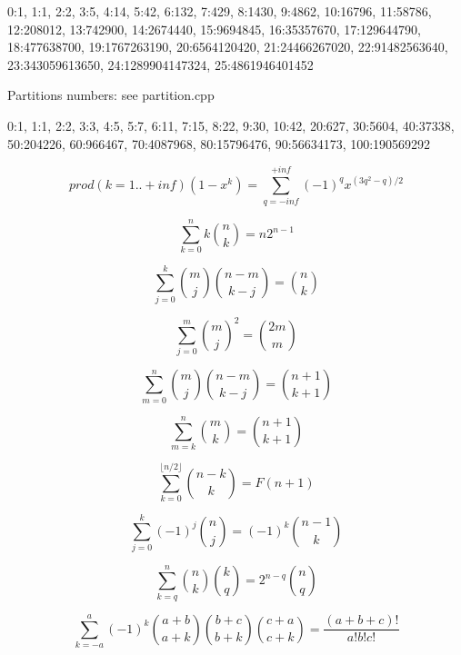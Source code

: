 0:1, 1:1, 2:2, 3:5, 4:14, 5:42, 6:132, 7:429, 8:1430, 9:4862,
10:16796, 11:58786, 12:208012, 13:742900, 14:2674440,
15:9694845, 16:35357670, 17:129644790, 18:477638700,
19:1767263190, 20:6564120420, 21:24466267020, 22:91482563640,
23:343059613650, 24:1289904147324, 25:4861946401452

Partitions numbers:
see partition.cpp

0:1, 1:1, 2:2, 3:3, 4:5, 5:7, 6:11, 7:15, 8:22, 9:30, 10:42, 20:627, 30:5604, 40:37338, 50:204226, 60:966467, 70:4087968, 80:15796476, 90:56634173, 100:190569292

$$prod (k=1..+inf) (1-x^k) = \sum_{q=-inf}^{+inf} {(-1)^q x^{(3q^2-q)/2}}$$

$$\sum_{k = 0}^{n}{k \binom{n}{k}} = n 2^{n - 1}$$

$$\sum_{j = 0}^{k}{\binom{m}{j} \binom{n - m}{k - j}} = \binom{n}{k}$$

$$\sum_{j = 0}^{m}{\binom{m}{j}^2} = \binom{2m}{m}$$

$$\sum_{m = 0}^{n}{\binom{m}{j}\binom{n - m}{k - j}} = \binom{n + 1}{k + 1}$$

$$\sum_{m = k}^{n}{\binom{m}{k}} = \binom{n + 1}{k + 1}$$

$$\sum_{k = 0}^{\lfloor n / 2 \rfloor}{\binom{n - k}{k}} = F(n + 1)$$

$$\sum_{j = 0}^{k}{(-1)^{j} \binom{n}{j}} = (-1)^k \binom{n - 1}{k}$$

$$\sum_{k = q}^{n}{\binom{n}{k} \binom{k}{q}} = 2^{n - q}\binom{n}{q}$$

$$\sum_{k =-a}^{a}{(-1)^k \binom{a + b}{a + k} \binom{b + c}{b + k} \binom{c + a}{c + k} } = \frac{(a + b + c)!}{a! b! c!}$$
